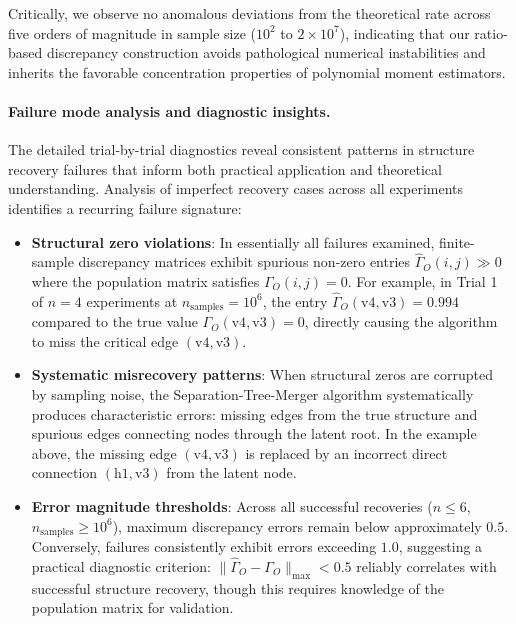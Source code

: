 \documentclass[11pt,a4paper]{article}
\numberwithin{equation}{section}
\begin{document}
Critically, we observe no anomalous deviations from the theoretical rate across five orders of magnitude in sample size ($10^2$ to $2 \times 10^7$), indicating that our ratio-based discrepancy construction avoids pathological numerical instabilities and inherits the favorable concentration properties of polynomial moment estimators.

\paragraph{Failure mode analysis and diagnostic insights.}

The detailed trial-by-trial diagnostics reveal consistent patterns in structure recovery failures that inform both practical application and theoretical understanding. Analysis of imperfect recovery cases across all experiments identifies a recurring failure signature:

\begin{itemize}
\item \textbf{Structural zero violations}: In essentially all failures examined, finite-sample discrepancy matrices exhibit spurious non-zero entries $\hat{\Gamma}_O(i,j) \gg 0$ where the population matrix satisfies $\Gamma_O(i,j) = 0$. For example, in Trial 1 of $n=4$ experiments at $n_{\text{samples}} = 10^6$, the entry $\hat{\Gamma}_O(\text{v4}, \text{v3}) = 0.994$ compared to the true value $\Gamma_O(\text{v4}, \text{v3}) = 0$, directly causing the algorithm to miss the critical edge $(\text{v4}, \text{v3})$.

\item \textbf{Systematic misrecovery patterns}: When structural zeros are corrupted by sampling noise, the Separation-Tree-Merger algorithm systematically produces characteristic errors: missing edges from the true structure and spurious edges connecting nodes through the latent root. In the example above, the missing edge $(\text{v4}, \text{v3})$ is replaced by an incorrect direct connection $(\text{h1}, \text{v3})$ from the latent node.

\item \textbf{Error magnitude thresholds}: Across all successful recoveries ($n \leq 6$, $n_{\text{samples}} \geq 10^6$), maximum discrepancy errors remain below approximately $0.5$. Conversely, failures consistently exhibit errors exceeding $1.0$, suggesting a practical diagnostic criterion: $\|\hat{\Gamma}_O - \Gamma_O\|_{\max} < 0.5$ reliably correlates with successful structure recovery, though this requires knowledge of the population matrix for validation.
\end{itemize}
\end{document}
